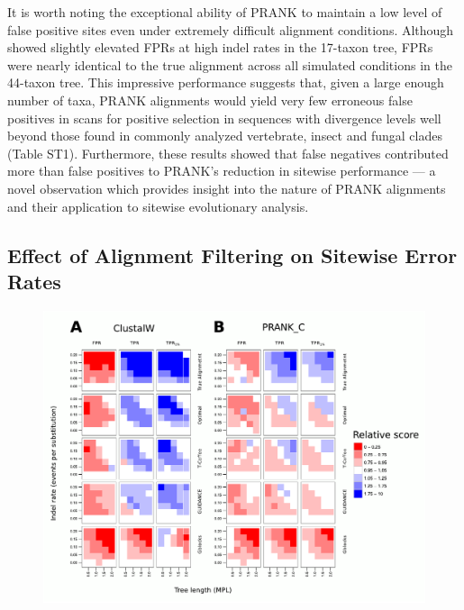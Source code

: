 \documentclass{mbe}
\begin{document}
It is worth noting the exceptional ability of PRANK to maintain a low
level of false positive sites even under extremely difficult alignment
conditions. Although \prankc{} showed slightly elevated FPRs at high
indel rates in the 17-taxon tree, FPRs were nearly identical to the
true alignment across all simulated conditions in the 44-taxon
tree. This impressive performance suggests that, given a large enough
number of taxa, PRANK alignments would yield very few erroneous false
positives in scans for positive selection in sequences with divergence
levels well beyond those found in commonly analyzed vertebrate, insect
and fungal clades (Table ST1). Furthermore, these results showed that
false negatives contributed more than false positives to PRANK’s
reduction in sitewise performance --- a novel observation which
provides insight into the nature of PRANK alignments and their
application to sitewise evolutionary analysis.

\subsection*{Effect of Alignment Filtering on Sitewise Error Rates}

\begin{figure}[t]
\begin{center}
\includegraphics[scale=0.8]{fig5.pdf}
\end{center}
\caption{}
\label{fig_5}
\end{figure}
\end{document}
